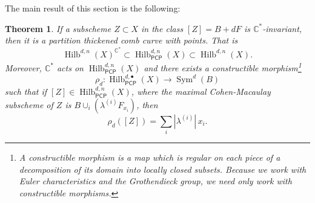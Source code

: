 \documentclass[12pt]{amsart}
\newtheorem{theorem}{Theorem}%
\theoremstyle{definition}
\newcommand{\CC} {\mathbb{C}}          %
\newcommand{\Sym}{\operatorname{Sym}}
\newcommand{\Hilb}{\operatorname{Hilb}}
\newcommand{\PCP}{\mathsf{PCP}}
\begin{document}
The main result of this section is the following:
\begin{theorem}\label{thm: C* invariant curves are partition thickened
comb curves with embedded points} If a subscheme $Z\subset X$ in the
class $[Z]=B+dF$ is $\CC^{*}$-invariant, then it is a partition
thickened comb curve with points. That is
\[
\Hilb^{d,n}(X)^{\CC^{*}}\subset \Hilb^{d,n}_{\PCP }(X)\subset \Hilb^{d,n}(X).
\]
Moreover, $\CC^{*}$ acts
on $\Hilb^{d,n}_{\PCP}(X)$ and there
exists a constructible morphism\footnote{A
constructible morphism is a map which is regular on each piece of a
decomposition of its domain into locally closed subsets. Because we
work with Euler characteristics and the Grothendieck group, we need
only work with constructible morphisms.}
\begin{equation}\label{eqn: rho : HilbPCP-->Sym(B)}
\rho_{d}: \Hilb^{d,\bullet}_{\PCP }(X) \to  \Sym^{d}(B)
\end{equation}
such that if $[Z]\in \Hilb_{\PCP}^{d,n}(X)$, where the maximal
Cohen-Macaulay subscheme of $Z$ is $B\cup_{i}\left(\lambda^{(i)}F_{x_{i}}
\right)$, then
\[
\rho_{d}([Z]) = \sum_{i} |\lambda^{(i)}|\,x_{i}. 
\]
\end{theorem}
\end{document}
